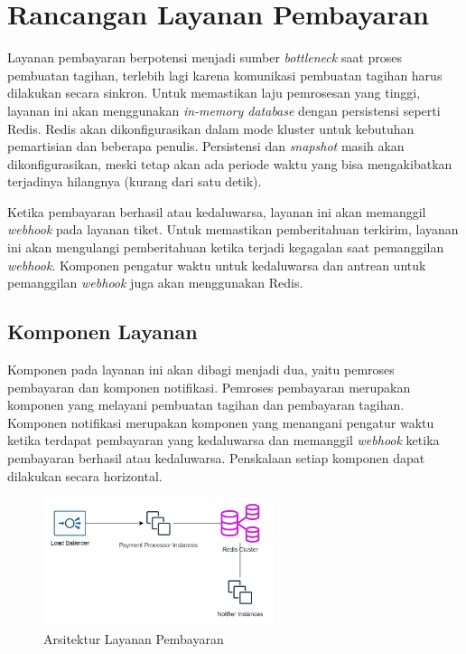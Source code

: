 \chapter{Rancangan Layanan Pembayaran}
\label{apx:payment-service}

Layanan pembayaran berpotensi menjadi sumber \textit{bottleneck} saat proses pembuatan tagihan, terlebih lagi karena komunikasi pembuatan tagihan harus dilakukan secara sinkron. Untuk memastikan laju pemrosesan yang tinggi, layanan ini akan menggunakan \textit{in-memory database} dengan persistensi seperti Redis. Redis akan dikonfigurasikan dalam mode kluster untuk kebutuhan pemartisian dan beberapa penulis. Persistensi dan \textit{snapshot} masih akan dikonfigurasikan, meski tetap akan ada periode waktu yang bisa mengakibatkan terjadinya hilangnya (kurang dari satu detik).

Ketika pembayaran berhasil atau kedaluwarsa, layanan ini akan memanggil \textit{webhook} pada layanan tiket. Untuk memastikan pemberitahuan terkirim, layanan ini akan mengulangi pemberitahuan ketika terjadi kegagalan saat pemanggilan \textit{webhook}. Komponen pengatur waktu untuk kedaluwarsa dan antrean untuk pemanggilan \textit{webhook} juga akan menggunakan Redis.

\section{Komponen Layanan}

Komponen pada layanan ini akan dibagi menjadi dua, yaitu pemroses pembayaran dan komponen notifikasi. Pemroses pembayaran merupakan komponen yang melayani pembuatan tagihan dan pembayaran tagihan. Komponen notifikasi merupakan komponen yang menangani pengatur waktu ketika terdapat pembayaran yang kedaluwarsa dan  memanggil \textit{webhook} ketika pembayaran berhasil atau kedaluwarsa. Penskalaan setiap komponen dapat dilakukan secara horizontal.

\pagebreak

\begin{figure}[htbp]
    \centering
    \includegraphics[width=0.6\textwidth]{resources/chapter-3/payment-service.png}
    \caption{Arsitektur Layanan Pembayaran}
    \label{fig:payment-service-deployment}
\end{figure}

